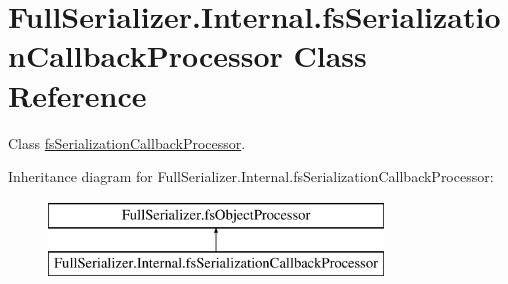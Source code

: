 \hypertarget{class_full_serializer_1_1_internal_1_1fs_serialization_callback_processor}{}\section{Full\+Serializer.\+Internal.\+fs\+Serialization\+Callback\+Processor Class Reference}
\label{class_full_serializer_1_1_internal_1_1fs_serialization_callback_processor}


Class \hyperlink{class_full_serializer_1_1_internal_1_1fs_serialization_callback_processor}{fs\+Serialization\+Callback\+Processor}.  


Inheritance diagram for Full\+Serializer.\+Internal.\+fs\+Serialization\+Callback\+Processor\+:\begin{figure}[H]
\begin{center}
\leavevmode
\includegraphics[height=2.000000cm]{class_full_serializer_1_1_internal_1_1fs_serialization_callback_processor}
\end{center}
\end{figure}
